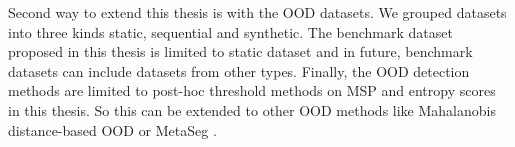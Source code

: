     Second way to extend this thesis is with the OOD datasets.
    We grouped datasets into three kinds static, sequential and synthetic.
    The benchmark dataset proposed in this thesis is limited to static dataset and in future, benchmark datasets can include datasets from other types.
    Finally, the OOD detection methods are limited to post-hoc threshold methods on MSP and entropy scores in this thesis.
    So this can be extended to other OOD methods like Mahalanobis distance-based OOD \cite{lee2018simple_mahalanobis} or MetaSeg \cite{MetaSeg}.

